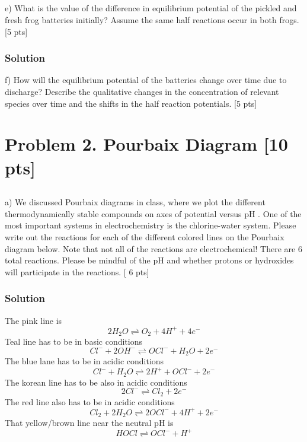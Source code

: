 \documentclass[12pt]{article}
\begin{document}
\subsection{}
e) What is the value of the difference in equilibrium potential of the pickled and fresh frog batteries initially? Assume the same half reactions occur in both frogs. [5 pts]\\[0pt]
\subsubsection{Solution}

f) How will the equilibrium potential of the batteries change over time due to discharge? Describe the qualitative changes in the concentration of relevant species over time and the shifts in the half reaction potentials. [5 pts]

\section{Problem 2. Pourbaix Diagram [10 pts]}
\subsection{}
a) We discussed Pourbaix diagrams in class, where we plot the different thermodynamically stable compounds on axes of potential versus pH . One of the most important systems in electrochemistry is the chlorine-water system. Please write out the reactions for each of the different colored lines on the Pourbaix diagram below. Note that not all of the reactions are electrochemical! There are 6 total reactions. Please be mindful of the pH and whether protons or hydroxides will participate in the reactions. [ 6 pts]\\[0pt]
\subsubsection{Solution}
The pink line is
\begin{equation}
    2H_2O \rightleftharpoons O_2 + 4H^+ + 4e^-
\end{equation}
Teal line has to be in basic conditions
\begin{equation}
    Cl^- + 2OH^- \rightleftharpoons OCl^- + H_2O + 2e^- 
\end{equation}
The blue lane has to be in acidic conditions
\begin{equation}
    Cl^- +H_2O \rightleftharpoons  2H^+ +OCl^- + 2e^-
\end{equation}
The korean line has to be also in acidic conditions
\begin{equation}
    2Cl^- \rightleftharpoons Cl_2 + 2e^-
\end{equation}
The red line also has to be in acidic conditions
\begin{equation}
    Cl_2 + 2H_2O \rightleftharpoons 2OCl^- + 4H^+ + 2e^-
\end{equation}
That yellow/brown line near the neutral pH is 
\begin{equation}
    HOCl \rightleftharpoons OCl^- + H^+
\end{equation}
\end{document}
